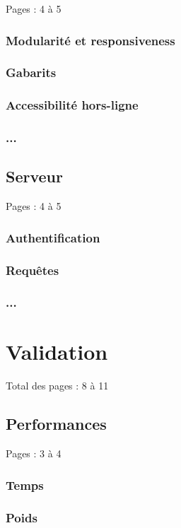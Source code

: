 \documentclass{eplmastersthesis_FR}
\begin{document}
			Pages : 4 à 5
			\subsection*{Modularité et responsiveness}
			\subsection*{Gabarits}
			\subsection*{Accessibilité hors-ligne}
			\subsection*{...}

		\section{Serveur}

			Pages : 4 à 5
			\subsection*{Authentification}
			\subsection*{Requêtes}
			\subsection*{...}

	\chapter{Validation}

		Total des pages : 8 à 11

		\section{Performances}

			Pages : 3 à 4

			\subsection*{Temps}
			\subsection*{Poids}
\end{document}
